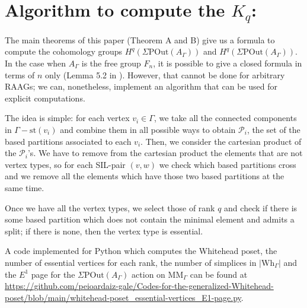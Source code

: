 \documentclass[a4paper]{amsart}
\newcommand{\G}{\Gamma}
\newcommand{\A}{{A_\Gamma}}
\newcommand{\POut}{\Sigma\mathrm{POut}}
\newcommand{\MM}{\mathrm{MM}}
\newcommand{\Wh}{\mathrm{Wh}}
\newcommand{\st}{\mathrm{st}}
\theoremstyle{definition}
\theoremstyle{remark}
\begin{document}
\appendix



\section{Algorithm to compute the $K_q$:} \label{appendix}

The main theorems of this paper (Theorem A and B) give us a formula to compute the cohomology groups $H^q(\POut(\A))$ and $H^q(\POut(\A))$. In the case when $\A$ is the free group $F_n$, it is possible to give a closed formula in terms of $n$ only (Lemma 5.2 in \cite{JMcCM}). However, that cannot be done for arbitrary RAAGs; we can, nonetheless, implement an algorithm that can be used for explicit computations. 

The idea is simple: for each vertex $v_i\in\G$, we take all the connected components in $\G-\st(v_i)$ and combine them in all possible ways to obtain $\mathcal{P}_i$, the set of the based partitions associated to each $v_i$. Then, we consider the cartesian product of the $\mathcal{P}_i$'s. We have to remove from the cartesian product the elements that are not vertex types, so for each SIL-pair $(v,w)$ we check which based partitions cross and we remove  all the elements which have those two based partitions at the same time.

Once we have all the vertex types, we select those of rank $q$  and check if there is some based partition which does not contain the minimal element and admits a split; if there is none, then the vertex type is essential.


A code implemented for Python which computes the Whitehead poset, the number of essential vertices for each rank, the number of simplices in $|\Wh_\G|$ and the $E^1$ page for the $\POut(\A)$ action on $\MM_\G$ can be found at \url{https://github.com/peioardaiz-gale/Codes-for-the-generalized-Whitehead-poset/blob/main/whitehead-poset_essential-vertices_E1-page.py}.
\end{document}
